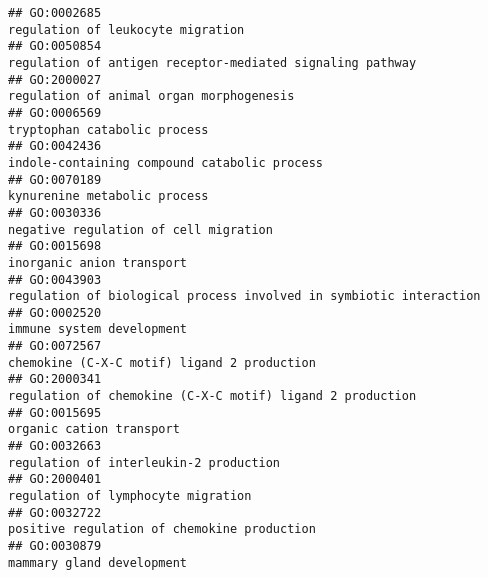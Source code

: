 \documentclass[
]{article}
\begin{document}
\begin{verbatim}
## GO:0002685                                                                                                                regulation of leukocyte migration
## GO:0050854                                                                                        regulation of antigen receptor-mediated signaling pathway
## GO:2000027                                                                                                         regulation of animal organ morphogenesis
## GO:0006569                                                                                                                     tryptophan catabolic process
## GO:0042436                                                                                                     indole-containing compound catabolic process
## GO:0070189                                                                                                                     kynurenine metabolic process
## GO:0030336                                                                                                            negative regulation of cell migration
## GO:0015698                                                                                                                        inorganic anion transport
## GO:0043903                                                                               regulation of biological process involved in symbiotic interaction
## GO:0002520                                                                                                                        immune system development
## GO:0072567                                                                                                      chemokine (C-X-C motif) ligand 2 production
## GO:2000341                                                                                        regulation of chemokine (C-X-C motif) ligand 2 production
## GO:0015695                                                                                                                         organic cation transport
## GO:0032663                                                                                                           regulation of interleukin-2 production
## GO:2000401                                                                                                               regulation of lymphocyte migration
## GO:0032722                                                                                                      positive regulation of chemokine production
## GO:0030879                                                                                                                        mammary gland development

\end{verbatim}
\end{document}
